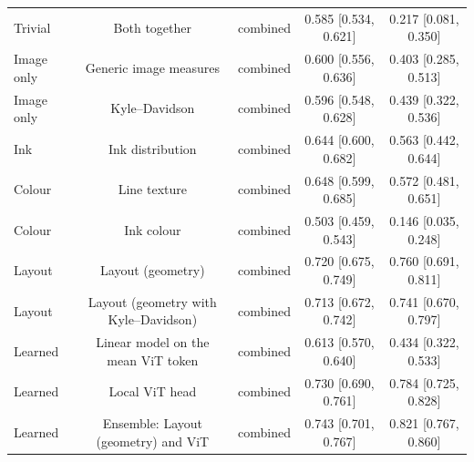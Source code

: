 \begin{table}[htbp]
\begin{tabular}{lcccc}
    Trivial & Both together & combined & 0.585 [0.534, 0.621] & 0.217 [0.081, 0.350] \\
    Image only & Generic image measures & combined & 0.600 [0.556, 0.636] & 0.403 [0.285, 0.513] \\
    Image only & Kyle--Davidson & combined & 0.596 [0.548, 0.628] & 0.439 [0.322, 0.536] \\
    Ink & Ink distribution & combined & 0.644 [0.600, 0.682] & 0.563 [0.442, 0.644] \\
    Colour & Line texture & combined & 0.648 [0.599, 0.685] & 0.572 [0.481, 0.651] \\
    Colour & Ink colour & combined & 0.503 [0.459, 0.543] & 0.146 [0.035, 0.248] \\
    Layout & Layout (geometry) & combined & 0.720 [0.675, 0.749] & 0.760 [0.691, 0.811] \\
    Layout & Layout (geometry with Kyle--Davidson) & combined & 0.713 [0.672, 0.742] & 0.741 [0.670, 0.797] \\
    Learned & Linear model on the mean ViT token & combined & 0.613 [0.570, 0.640] & 0.434 [0.322, 0.533] \\
    Learned & Local ViT head & combined & 0.730 [0.690, 0.761] & 0.784 [0.725, 0.828] \\
    Learned & Ensemble: Layout (geometry) and ViT & combined & 0.743 [0.701, 0.767] & 0.821 [0.767, 0.860] \\
    \bottomrule
  \end{tabular}
\end{table}
